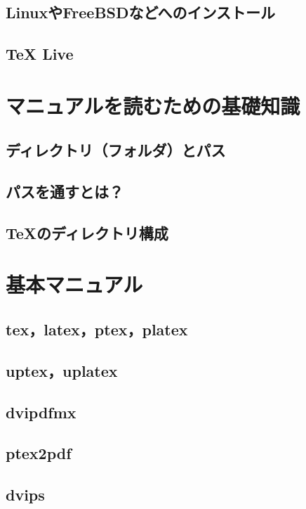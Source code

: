 \documentclass{jsbook}
\begin{document}
\section{LinuxやFreeBSDなどへのインストール}

\section{TeX Live}

\chapter{マニュアルを読むための基礎知識}

\section{ディレクトリ（フォルダ）とパス}

\section{パスを通すとは？}

\section{\TeX のディレクトリ構成}

\chapter{基本マニュアル}

\section{tex，latex，ptex，platex}

\section{uptex，uplatex}

\section{dvipdfmx}

\section{ptex2pdf}

\section{dvips}
\end{document}
